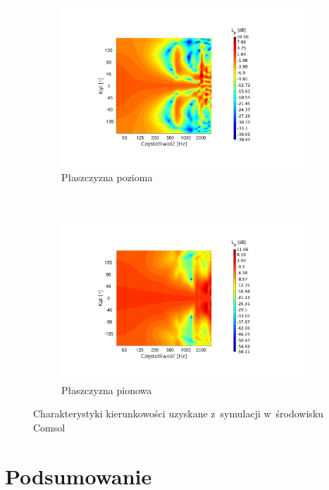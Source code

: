 \documentclass[12pt]{oska}
\begin{document}
	\begin{figure}[!ht]
		\centering
		\begin{subfigure}[b]{.49\textwidth}
			\includegraphics[width=\textwidth,trim={4.6cm 2.6cm 5.8cm 2.7cm},clip]{Comsol_kier_osie_hor.pdf}
			\caption{Płaszczyzna pozioma}
			\label{r:C_poziom}
		\end{subfigure}
		~
		\begin{subfigure}[b]{.49\textwidth}
			\includegraphics[width=\textwidth,trim={4.6cm 2.6cm 5.8cm 2.7cm},clip]{Comsol_kier_osie_ver.pdf}
			\caption{Płaszczyzna pionowa}
			\label{r:C_pion}
		\end{subfigure}
		
		\caption{Charakterystyki kierunkowości uzyskane z~symulacji w~środowisku Comsol}
		\label{r:C_kierunk}
	\end{figure}
	
	\section{Podsumowanie}
	
\end{document}
